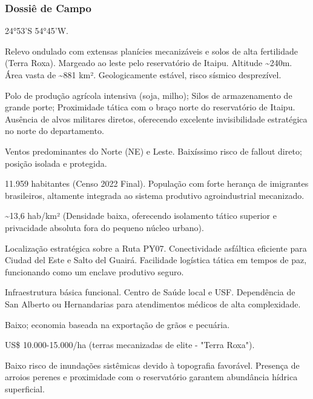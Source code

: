 \subsubsection{Dossiê de Campo}
\begin{description}[style=nextline,leftmargin=0.5cm,font=\bfseries]
\item[Coordenadas]  24°53'S 54°45'W.
\item[Topografia]  Relevo ondulado com extensas planícies mecanizáveis e solos de alta fertilidade (Terra Roxa). Margeado ao leste pelo reservatório de Itaipu. Altitude \textasciitilde 240m. Área vasta de \textasciitilde 881 km². Geologicamente estável, risco sísmico desprezível.
\item[Alvos Estratégicos]  Polo de produção agrícola intensiva (soja, milho); Silos de armazenamento de grande porte; Proximidade tática com o braço norte do reservatório de Itaipu. Ausência de alvos militares diretos, oferecendo excelente invisibilidade estratégica no norte do departamento.
\item[Fallout]  Ventos predominantes do Norte (NE) e Leste. Baixíssimo risco de fallout direto; posição isolada e protegida.
\item[População]  11.959 habitantes (Censo 2022 Final). População com forte herança de imigrantes brasileiros, altamente integrada ao sistema produtivo agroindustrial mecanizado.
\item[Densidade]  \textasciitilde 13,6 hab/\allowbreak km² (Densidade baixa, oferecendo isolamento tático superior e privacidade absoluta fora do pequeno núcleo urbano).
\item[Vias de Acesso]  Localização estratégica sobre a Ruta PY07. Conectividade asfáltica eficiente para Ciudad del Este e Salto del Guairá. Facilidade logística tática em tempos de paz, funcionando como um enclave produtivo seguro.
\item[Serviços]  Infraestrutura básica funcional. Centro de Saúde local e USF. Dependência de San Alberto ou Hernandarias para atendimentos médicos de alta complexidade.
\item[Custo de Vida]  Baixo; economia baseada na exportação de grãos e pecuária.
\item[Preço da Terra]  US\$ 10.000-15.000/\allowbreak ha (terras mecanizadas de elite - "Terra Roxa").
\item[Hidrologia]  Baixo risco de inundações sistêmicas devido à topografia favorável. Presença de arroios perenes e proximidade com o reservatório garantem abundância hídrica superficial.

\end{description}

